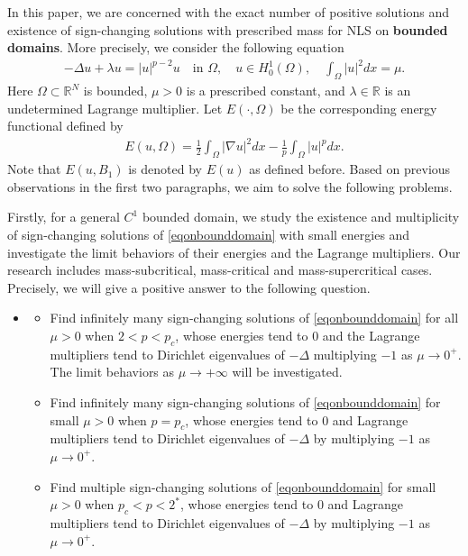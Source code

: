 \documentclass[10pt,a4paper]{article}
\theoremstyle{definition} \theoremstyle{remark}
\numberwithin{equation}{section}
\newcommand{\R}{\mathbb{R}}
\newcommand{\la}{\lambda}
\begin{document}


\vskip0.1in
 
	In this paper, we are concerned with the exact number of positive solutions and existence of sign-changing solutions with prescribed mass for NLS on \textbf{bounded domains}. More precisely, we consider the following equation
	\begin{align} \label{eqonbounddomain}
		-\Delta u + \la u = |u|^{p-2}u \quad \text{in } \Omega, \quad u \in H_0^1(\Omega), \quad \int_{\Omega}|u|^2dx = \mu.
	\end{align}
    Here $\Omega \subset \R^N$ is bounded, $\mu > 0$ is a prescribed constant, and $\la \in \R$ is an undetermined Lagrange multiplier. Let $E(\cdot,\Omega)$ be the corresponding energy functional defined by
    \begin{align*}
    	E(u,\Omega) = \frac12\int_\Omega |\nabla u|^2dx - \frac1p \int_\Omega |u|^pdx.
    \end{align*}
    Note that $E(u,B_1)$ is denoted by $E(u)$ as defined before. Based on previous observations in the first two paragraphs, we aim to solve the following problems.

    \vskip0.1in

    Firstly, for a general $C^1$ bounded domain, we study the existence and multiplicity of sign-changing solutions of \eqref{eqonbounddomain} with small energies and investigate the limit behaviors of their energies and the Lagrange multipliers. Our research includes  mass-subcritical, mass-critical  and mass-supercritical cases. Precisely, we will give a positive answer to the following question.
    \begin{itemize}
    	\item[{\bf(Q1)}:]
    	\begin{itemize}
    		\item Find infinitely many sign-changing solutions of \eqref{eqonbounddomain} for all $\mu > 0$ when $2 < p < p_c$, whose energies tend to $0$ and the Lagrange multipliers tend to Dirichlet eigenvalues of $-\Delta$ multiplying $-1$ as $\mu \to 0^+$. The limit behaviors as $\mu \to +\infty$ will  be investigated.
    		\item Find infinitely many sign-changing solutions of \eqref{eqonbounddomain} for small $\mu > 0$ when $p = p_c$, whose energies tend to $0$ and Lagrange multipliers tend to Dirichlet eigenvalues of $-\Delta$ by multiplying $-1$ as $\mu \to 0^+$.
    		\item Find multiple sign-changing solutions of \eqref{eqonbounddomain} for small $\mu > 0$ when $p_c < p < 2^*$, whose energies tend to $0$ and Lagrange multipliers tend to Dirichlet eigenvalues of $-\Delta$ by multiplying $-1$ as $\mu \to 0^+$.
    	\end{itemize}
    \end{itemize}
\end{document}
